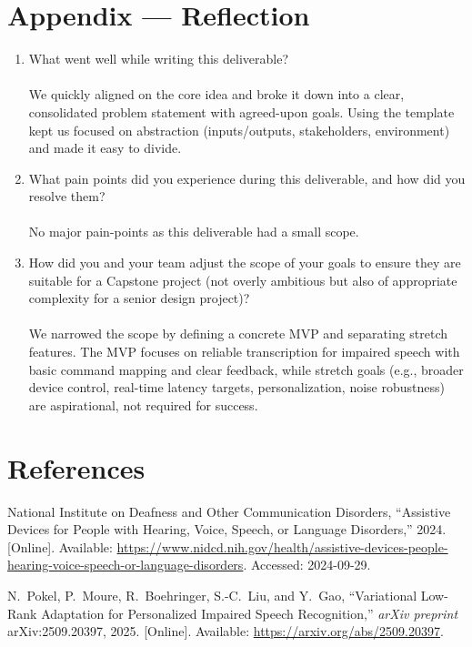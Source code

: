 \documentclass{article}
\begin{document}
\newpage{}

\section*{Appendix --- Reflection}


\begin{enumerate}
    \item What went well while writing this deliverable? \\ \\
    We quickly aligned on the core idea and broke it down into a clear, consolidated problem statement with agreed-upon goals. Using the template kept us focused on abstraction (inputs/outputs, stakeholders, environment) and made it easy to divide.
    \item What pain points did you experience during this deliverable, and how
    did you resolve them? \\ \\
    No major pain-points as this deliverable had a small scope.
    \item How did you and your team adjust the scope of your goals to ensure
    they are suitable for a Capstone project (not overly ambitious but also of
    appropriate complexity for a senior design project)? \\ \\
    We narrowed the scope by defining a concrete MVP and separating stretch features. The MVP focuses on reliable transcription for impaired speech with basic command mapping and clear feedback, while stretch goals (e.g., broader device control, real-time latency targets, personalization, noise robustness) are aspirational, not required for success.
\end{enumerate} 

\section*{References}
%
\begin{thebibliography}{00}

National Institute on Deafness and Other Communication Disorders,
``Assistive Devices for People with Hearing, Voice, Speech, or Language Disorders,'' 2024.
[Online]. Available: \url{https://www.nidcd.nih.gov/health/assistive-devices-people-hearing-voice-speech-or-language-disorders}.
Accessed: 2024-09-29.

N.~Pokel, P.~Moure, R.~Boehringer, S.-C.~Liu, and Y.~Gao,
``Variational Low-Rank Adaptation for Personalized Impaired Speech Recognition,''
\emph{arXiv preprint} arXiv:2509.20397, 2025.
[Online]. Available: \url{https://arxiv.org/abs/2509.20397}.

\end{thebibliography}
\end{document}
